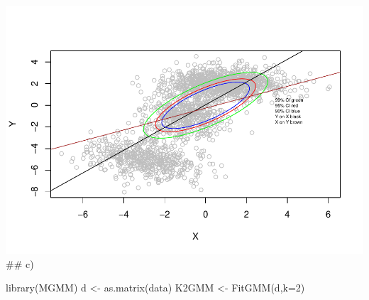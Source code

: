 \documentclass[
]{article}
\newenvironment{Shaded}{\begin{snugshade}}{\end{snugshade}}
\newcommand{\AttributeTok}[1]{\textcolor[rgb]{0.77,0.63,0.00}{#1}}
\newcommand{\DecValTok}[1]{\textcolor[rgb]{0.00,0.00,0.81}{#1}}
\newcommand{\FunctionTok}[1]{\textcolor[rgb]{0.00,0.00,0.00}{#1}}
\newcommand{\NormalTok}[1]{#1}
\newcommand{\OtherTok}[1]{\textcolor[rgb]{0.56,0.35,0.01}{#1}}
\begin{document}
\includegraphics{539-hw3_files/figure-latex/unnamed-chunk-9-1.pdf} \#\#
c)

\begin{Shaded}
\begin{Highlighting}[]
\FunctionTok{library}\NormalTok{(MGMM)}
\NormalTok{d }\OtherTok{\textless{}{-}} \FunctionTok{as.matrix}\NormalTok{(data)}
\NormalTok{K2GMM }\OtherTok{\textless{}{-}} \FunctionTok{FitGMM}\NormalTok{(d,}\AttributeTok{k=}\DecValTok{2}\NormalTok{)}
\end{Highlighting}
\end{Shaded}
\end{document}
